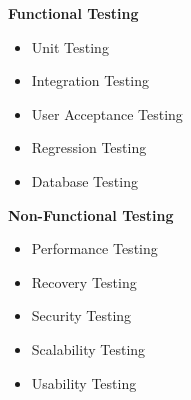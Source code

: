 \begin{minipage}{0.475\textwidth}
  \centering
  \textbf{Functional Testing}\\
  \cite{wiki:functionalTesting}
  \begin{itemize}
    \item Unit Testing
    \item Integration Testing
    \item User Acceptance Testing
    \item Regression Testing
    \item Database Testing
  \end{itemize}
\end{minipage}
\hfill
\begin{minipage}{0.475\textwidth}
  \centering
  \textbf{Non-Functional Testing}\\
  \cite{wiki:nonFunctionalTesting}
  \begin{itemize}
    \item Performance Testing
    \item Recovery Testing
    \item Security Testing
    \item Scalability Testing
    \item Usability Testing
  \end{itemize}
\end{minipage}
